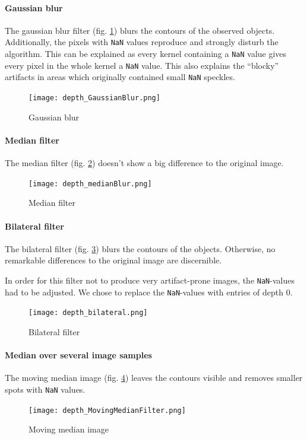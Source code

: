 \documentclass[DIV12,a4paper]{scrartcl}
\begin{document}
\paragraph{Gaussian blur}
The gaussian blur filter (fig. \ref{fig:gaussian_blur}) blurs the contours of the observed objects. Additionally, the pixels with \texttt{NaN} values reproduce and strongly disturb the algorithm. This can be explained as every kernel containing a \texttt{NaN} value gives every pixel in the whole kernel a \texttt{NaN} value. This also explains the ``blocky'' artifacts in areas which originally contained small \texttt{NaN} speckles.
\begin{figure}[!htbp]
  \centering
  \texttt{[image: depth\_GaussianBlur.png]}
  \caption{Gaussian blur}
  \label{fig:gaussian_blur}
\end{figure}

\paragraph{Median filter}
The median filter (fig. \ref{fig:median_depth}) doesn't show a big difference to the original image.
\begin{figure}[!htbp]
  \centering
  \texttt{[image: depth\_medianBlur.png]}
  \caption{Median filter}
  \label{fig:median_depth}
\end{figure}

\paragraph{Bilateral filter}
The bilateral filter (fig. \ref{fig:bilateral_depth}) blurs the contours of the objects. Otherwise, no remarkable differences to the original image are discernible.\par
In order for this filter not to produce very artifact-prone images, the \texttt{NaN}-values had to be adjusted. We chose to replace the \texttt{NaN}-values with entries of depth 0.
\begin{figure}[!htbp]
  \centering
  \texttt{[image: depth\_bilateral.png]}
  \caption{Bilateral filter}
  \label{fig:bilateral_depth}
\end{figure}
\paragraph{Median over several image samples}
The moving median image (fig. \ref{fig:moving_median_depth}) leaves the contours visible and removes smaller spots with \texttt{NaN} values.
\begin{figure}[!htbp]
  \centering
  \texttt{[image: depth\_MovingMedianFilter.png]}
  \caption{Moving median image}
  \label{fig:moving_median_depth}
\end{figure}
\end{document}
